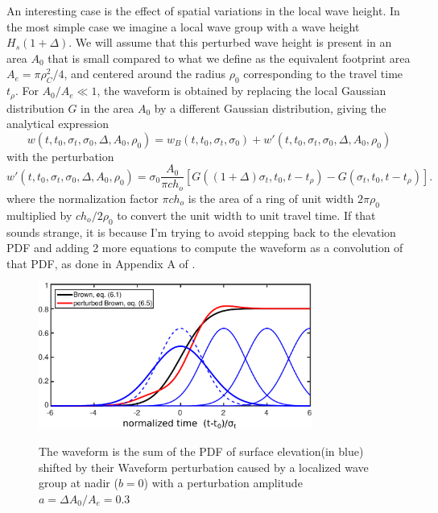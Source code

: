 An interesting case is the effect of spatial variations in the local wave height. In the most simple case we imagine a local wave group with a wave height $H_s(1+\Delta)$. We will assume that this perturbed wave height is present in an area $A_0$ that is small compared to what we define as the equivalent footprint area $A_e= \pi \rho_C^2/4$, and centered around the radius $\rho_0$ corresponding to the travel time $t_\rho$. For $A_0/A_e \ll 1$, the waveform is obtained by replacing the local Gaussian distribution $G$ in the area $A_0$ by a different Gaussian distribution, giving the analytical expression 
\begin{equation}
    w(t,t_0,\sigma_t,\sigma_0,\Delta, A_0,\rho_0)=  w_B(t,t_0,\sigma_t,\sigma_0) + w'(t,t_0,\sigma_t,\sigma_0,\Delta, A_0,\rho_0)
\end{equation}
with the perturbation 
\begin{equation}
    w'(t,t_0,\sigma_t,\sigma_0,\Delta, A_0,\rho_0) = \sigma_0 \frac{A_0 }{ \pi c h_o} \left[ G((1+\Delta)\sigma_t,t_0,t-t_\rho)- G(\sigma_t,t_0,t-t_\rho)  \right].
\end{equation}
where the normalization factor $\pi c h_o$ is the area of a ring of unit width $2 \pi \rho_0$ multiplied by $c h_o / 2 \rho_0$ to convert the unit width to unit travel time. If that sounds strange, it is because I'm trying to avoid stepping back to the elevation PDF and adding 2 more equations to compute the waveform as a convolution of that PDF, as done  in Appendix A of \cite{DeCarlo&Ardhuin2024}.  
\begin{figure}[h!]
\centerline{\includegraphics[width=0.8\textwidth]{FIGS_CH_SAT/waveforms_perturbation.pdf}}
  \caption{The waveform is the sum of the PDF of surface elevation(in blue) shifted by their Waveform perturbation caused by a localized wave group at nadir ($b=0$) with a perturbation amplitude $a=\Delta A_0/A_e=0.3$}{} \label{fig:group_alti_perturb}
\end{figure}

